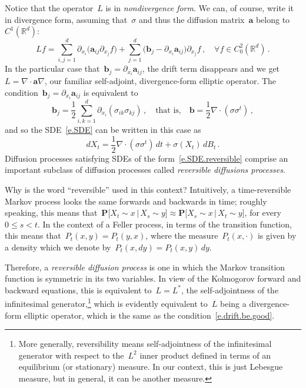 \documentclass[11pt,twoside]{article} %
\numberwithin{equation}{section}
\theoremstyle{definition}
\newcommand*{\Rd}{\ensuremath{\mathbb{R}^d}}
\renewcommand{\b}{\ensuremath{\mathbf{b}}}
\renewcommand{\a}{\mathbf{a}}
\begin{document}
Notice that the operator~$L$ is in \emph{nondivergence form}. 
We can, of course, write it in divergence form, assuming that~$\sigma$ and thus the diffusion matrix~$\a$ belong to~$C^1(\Rd)$:
\begin{equation*}
L f = 
\sum_{i,j=1}^d \partial_{x_i} \bigl(  \a_{ij} \partial_{x_j} f \bigr)
+
\sum_{j=1}^d \bigl( \b_j - \partial_{x_i} \a_{ij} \bigr) \partial_{x_j} f 
\,, \quad \forall f \in C^2_0(\Rd)\,.
\end{equation*}
In the particular case that~$\b_j = \partial_{x_i} \a_{ij}$, the drift term disappears and we get~$L = \nabla \cdot \a\nabla$, our familiar self-adjoint, divergence-form elliptic operator. The condition~$\b_j = \partial_{x_i} \a_{ij}$ is equivalent to
\begin{equation}
\label{e.drift.be.good}
\b_j = \frac12 \sum_{i,k=1}^d 
\partial_{x_i}( \sigma_{ik}\sigma_{kj}) 
\,,
\quad \mbox{that is,} \quad 
\b 
=
\frac12 \nabla \cdot (\sigma \sigma^t) \,,
\end{equation}
and so the SDE~\eqref{e.SDE} can be written in this case as
\begin{equation}
\label{e.SDE.reversible}
dX_t = \frac12 \nabla \cdot (\sigma \sigma^t)  \, dt + \sigma(X_t) \, dB_t
\,.
\end{equation}
Diffusion processes satisfying SDEs of the form~\eqref{e.SDE.reversible} comprise an important subclass of diffusion processes called \emph{reversible diffusions processes}.


\smallskip

Why is the word ``reversible'' used in this context? Intuitively, a time-reversible Markov process looks the same forwards and backwards in time; roughly speaking, this means that~$\mathbf{P}\bigl[ X_t \sim x \,|\, X_s \sim y \bigr] \approx \mathbf{P}\bigl[ X_s \sim x \,|\, X_t \sim y \bigr]$, for every~$0\leq s< t$. In the context of a Feller process, in terms of the transition function, this means that~$P_t(x,y) = P_t(y,x)$, where the measure~$P_t(x,\cdot)$ is given by a density which we denote by~$P_t(x,dy) = P_t(x,y)\,dy$.

\smallskip

Therefore, a \emph{reversible diffusion process} is one in which the Markov transition function is symmetric in its two variables. In view of the Kolmogorov forward and backward equations, this is equivalent to~$L=L^*$, the self-adjointness of the infinitesimal generator,\footnote{More generally, reversibility means self-adjointness of the infinitesimal generator with respect to the~$L^2$ inner product defined in terms of an equilibrium (or stationary) measure. In our context, this is just Lebesgue measure, but in general, it can be another measure.} which is evidently equivalent to~$L$ being a divergence-form elliptic operator, which is the same as the condition~\eqref{e.drift.be.good}. 
\end{document}
